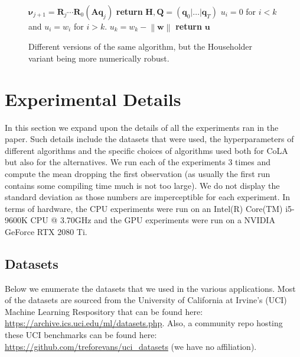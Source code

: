 \documentclass{article}
\newcommand{\norm}[1]{\left\lVert#1\right\rVert}
\newcommand{\mbf}[1]{{\boldsymbol{\mathbf{#1}}}}
\renewcommand{\bm}{\mbf}
\begin{document}
\begin{figure}[htbp]
\begin{minipage}[t]{0.49\linewidth}
\begin{algorithm}[H]
\begin{algorithmic}[1]
            \vspace{0.05cm}
              \State $\bm{\nu}_{j+1} = \bm{R}_{j} \cdots \bm{R}_{0} (\bm{A} \bm{q}_{j})$
              \vspace{0.05cm}
            \EndIf
        \EndFor
        \State \textbf{return} $\bm{H}, \bm{Q} = \left(\bm{q}_{0} | \dots | \bm{q}_{T}\right)$
        \vspace{0.03cm}
        \Function{\texttt{GET\_HOUSEHOLDER\_VEC}}{$\bm{w}$, $k$}
            \State $u_{i}=0$ for $i < k$ and $u_{i} = w_{i}$ for $i > k$.
            \State $u_{k}=w_{k} - \norm{\bm{w}}$
            \State \textbf{return} $\bm{u}$
        \EndFunction
      \end{algorithmic}
    \end{algorithm}
  \end{minipage}
  \caption{Different versions of the same algorithm, but the Householder variant being more numerically robust.}
  \label{fig:arnoldi-versions}
\end{figure}

\section{Experimental Details} \label{app:experiments}
In this section we expand upon the details of all the experiments ran in the paper.
Such details include the datasets that were used, the hyperparameters of different algorithms and the specific choices of algorithms used both for CoLA but also for the alternatives.
We run each of the experiments 3 times and compute the mean dropping the first observation (as usually the first run contains some compiling time much is not too large).
We do not display the standard deviation as those numbers are imperceptible for each experiment.
In terms of hardware, the CPU experiments were run on an Intel(R) Core(TM) i5-9600K CPU @ 3.70GHz and the GPU experiments were run on a NVIDIA GeForce RTX 2080 Ti.

\subsection{Datasets} \label{app:datasets}
Below we enumerate the datasets that we used in the various applications.
Most of the datasets are sourced from the University of California at Irvine's (UCI) Machine Learning Respository
that can be found here: \url{https://archive.ics.uci.edu/ml/datasets.php}.
Also, a community repo hosting these UCI benchmarks can be found
here:
\url{https://github.com/treforevans/uci_datasets} (we have no affiliation).
\end{document}
